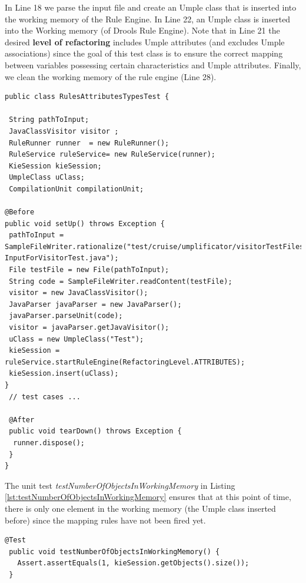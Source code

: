 In Line 18 we parse the input file and create an Umple class that is inserted into the working memory of the Rule Engine. In Line 22, an Umple class is inserted into the Working memory (of Drools Rule Engine). Note that in Line 21  the desired \textbf{level of refactoring} includes Umple attributes (and excludes Umple associations) since the goal of this test class is to ensure the correct mapping between variables possessing certain characteristics and Umple attributes. Finally, we clean the working memory of the rule engine (Line 28).

\begin{lstlisting}[style=java, label=lst:testClassSetup, caption=RulesAttributesTypesTest class]
public class RulesAttributesTypesTest {

 String pathToInput;
 JavaClassVisitor visitor ;
 RuleRunner runner  = new RuleRunner();
 RuleService ruleService= new RuleService(runner);
 KieSession kieSession;
 UmpleClass uClass;
 CompilationUnit compilationUnit;
	
@Before
public void setUp() throws Exception {
 pathToInput = SampleFileWriter.rationalize("test/cruise/umplificator/visitorTestFiles/   InputForVisitorTest.java");
 File testFile = new File(pathToInput);
 String code = SampleFileWriter.readContent(testFile);
 visitor = new JavaClassVisitor();
 JavaParser javaParser = new JavaParser();
 javaParser.parseUnit(code);
 visitor = javaParser.getJavaVisitor();
 uClass = new UmpleClass("Test");
 kieSession = ruleService.startRuleEngine(RefactoringLevel.ATTRIBUTES);
 kieSession.insert(uClass);
}
 // test cases ...
 
 @After
 public void tearDown() throws Exception {
  runner.dispose();		
 }
}
\end{lstlisting}

The unit test \textit{testNumberOfObjectsInWorkingMemory} in Listing \ref{lst:testNumberOfObjectsInWorkingMemory} ensures that at this point of time, there is only one element in the working memory (the Umple class inserted  before) since the mapping rules have not been fired yet.

\begin{lstlisting}[style=java, label=lst:testNumberOfObjectsInWorkingMemory, caption=Test asserting the working memory contents]
 @Test
 public void testNumberOfObjectsInWorkingMemory() {
   Assert.assertEquals(1, kieSession.getObjects().size());
 }
\end{lstlisting}

